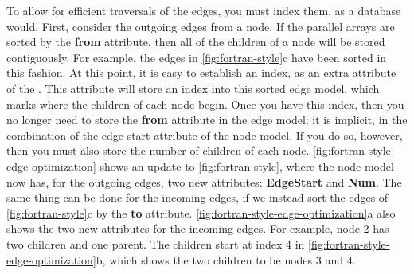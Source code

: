 To allow for efficient traversals of the edges, you must index them, as a
database would. First, consider the outgoing edges from a node. If the
 parallel arrays are sorted by the \textbf{from} attribute, then
all of the children of a node will be stored contiguously. For example, the
edges in \autoref{fig:fortran-style}c have been sorted in this fashion.
At this point, it is
easy to establish an index, as an extra attribute of the . This
attribute will store an index into this sorted edge model, which marks where the
children of each node begin. Once you have this index, then you no longer need to
store the \textbf{from} attribute in the edge model; it is implicit, in the
combination of the edge-start attribute of the node model. If you do so,
however, then you must also store the number of children of each node. 
\autoref{fig:fortran-style-edge-optimization} shows an update to
\autoref{fig:fortran-style}, where the node model now has, for the outgoing
edges, two new attributes: \textbf{EdgeStart} and \textbf{Num}. The same thing
can be done for the incoming edges, if we instead sort the edges of 
\autoref{fig:fortran-style}c by the \textbf{to} attribute.
\autoref{fig:fortran-style-edge-optimization}a also shows the two new attributes
for the incoming edges.  For example, node 2 has two children and
one parent. The children start at index 4 in
\autoref{fig:fortran-style-edge-optimization}b, which shows the two children to
be nodes 3 and 4.

